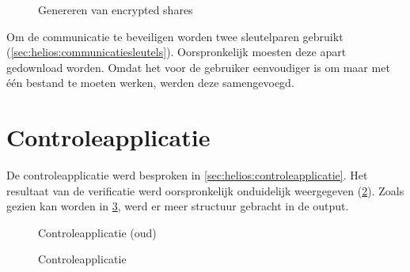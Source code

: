 \begin{figure}
  \caption{Genereren van encrypted shares}
  \label{fig:ui:trustees_home_encrypted_shares}
\end{figure}

\npar Om de communicatie te beveiligen worden twee sleutelparen gebruikt (\ref{sec:helios:communicatiesleutels}). Oorspronkelijk moesten deze apart gedownload worden. Omdat het voor de gebruiker eenvoudiger is om maar met \'e\'en bestand te moeten werken, werden deze samengevoegd.

\section{Controleapplicatie}
\label{sec:ui:controleapplicatie}

De controleapplicatie werd besproken in \ref{sec:helios:controleapplicatie}. Het resultaat van de verificatie werd oorspronkelijk onduidelijk weergegeven  (\ref{fig:ui:verifier_old}). Zoals gezien kan worden in \ref{fig:ui:verifier}, werd er meer structuur gebracht in de output.

\begin{figure}
  \caption{Controleapplicatie (oud)}
  \label{fig:ui:verifier_old}
\end{figure}

\begin{figure}
  \caption{Controleapplicatie}
  \label{fig:ui:verifier}
\end{figure}
